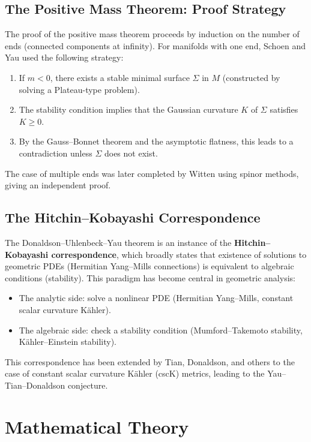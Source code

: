 \subsection{The Positive Mass Theorem: Proof Strategy}

The proof of the positive mass theorem proceeds by induction on the number of ends (connected components at infinity). For manifolds with one end, Schoen and Yau used the following strategy:
\begin{enumerate}
    \item If $m < 0$, there exists a stable minimal surface $\Sigma$ in $M$ (constructed by solving a Plateau-type problem).
    \item The stability condition implies that the Gaussian curvature $K$ of $\Sigma$ satisfies $K \geq 0$.
    \item By the Gauss--Bonnet theorem and the asymptotic flatness, this leads to a contradiction unless $\Sigma$ does not exist.
\end{enumerate}

The case of multiple ends was later completed by Witten using spinor methods, giving an independent proof.

\subsection{The Hitchin--Kobayashi Correspondence}

The Donaldson--Uhlenbeck--Yau theorem is an instance of the \textbf{Hitchin--Kobayashi correspondence}, which broadly states that existence of solutions to geometric PDEs (Hermitian Yang--Mills connections) is equivalent to algebraic conditions (stability). This paradigm has become central in geometric analysis:
\begin{itemize}
    \item The analytic side: solve a nonlinear PDE (Hermitian Yang--Mills, constant scalar curvature K\"ahler).
    \item The algebraic side: check a stability condition (Mumford--Takemoto stability, K\"ahler--Einstein stability).
\end{itemize}

This correspondence has been extended by Tian, Donaldson, and others to the case of constant scalar curvature K\"ahler (cscK) metrics, leading to the Yau--Tian--Donaldson conjecture.

\section{Mathematical Theory}

